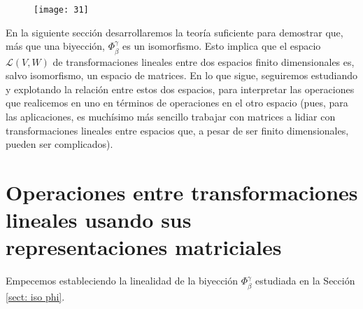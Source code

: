 \begin{figure}[H]
	\centering
	\texttt{[image:  31]} 
\end{figure}	


En la siguiente sección desarrollaremos la teoría suficiente
para demostrar que, más que una biyección, $\Phi_{\beta}^{\gamma}$
es un isomorfismo. Esto implica que el espacio
$\mathcal{L}(V, W)$ de transformaciones lineales entre
dos espacios finito dimensionales es, 
salvo isomorfismo, un espacio de matrices. En lo que sigue,
seguiremos estudiando y explotando la relación entre 
estos 
dos espacios,
para interpretar las operaciones que realicemos en uno en
términos de operaciones en el otro espacio (pues, para las aplicaciones,
es muchísimo más sencillo trabajar con matrices a lidiar
con transformaciones lineales entre espacios que, a pesar de ser
finito dimensionales, pueden ser complicados).



\section{Operaciones entre transformaciones lineales usando sus representaciones matriciales}


Empecemos estableciendo la linealidad de la biyección
$\Phi_{\beta}^{\gamma}$ estudiada en 
la Sección \ref{sect: iso phi}.


